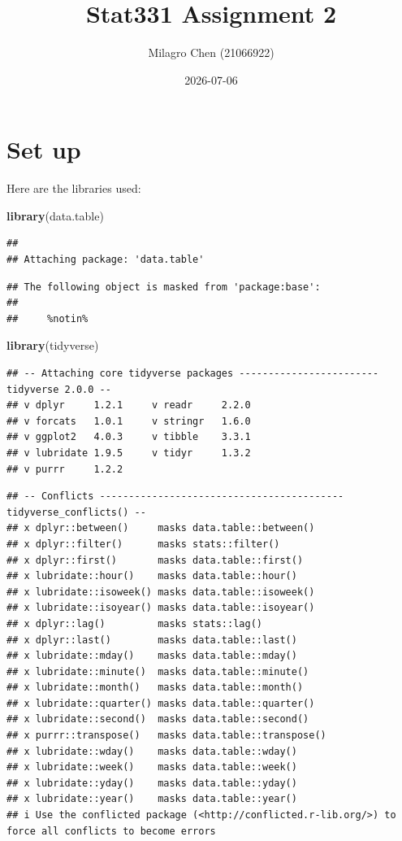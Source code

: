 \documentclass[
]{article}
\title{Stat331 Assignment 2}
\author{Milagro Chen (21066922)}
\date{2026-07-06}
\newenvironment{Shaded}{\begin{snugshade}}{\end{snugshade}}
\newcommand{\FunctionTok}[1]{\textcolor[rgb]{0.13,0.29,0.53}{\textbf{#1}}}
\newcommand{\NormalTok}[1]{#1}
\begin{document}
\maketitle

\section{Set up}\label{set-up}

Here are the libraries used:

\begin{Shaded}
\begin{Highlighting}[]
\FunctionTok{library}\NormalTok{(data.table)}
\end{Highlighting}
\end{Shaded}

\begin{verbatim}
## 
## Attaching package: 'data.table'
\end{verbatim}

\begin{verbatim}
## The following object is masked from 'package:base':
## 
##     %notin%
\end{verbatim}

\begin{Shaded}
\begin{Highlighting}[]
\FunctionTok{library}\NormalTok{(tidyverse)}
\end{Highlighting}
\end{Shaded}

\begin{verbatim}
## -- Attaching core tidyverse packages ------------------------ tidyverse 2.0.0 --
## v dplyr     1.2.1     v readr     2.2.0
## v forcats   1.0.1     v stringr   1.6.0
## v ggplot2   4.0.3     v tibble    3.3.1
## v lubridate 1.9.5     v tidyr     1.3.2
## v purrr     1.2.2
\end{verbatim}

\begin{verbatim}
## -- Conflicts ------------------------------------------ tidyverse_conflicts() --
## x dplyr::between()     masks data.table::between()
## x dplyr::filter()      masks stats::filter()
## x dplyr::first()       masks data.table::first()
## x lubridate::hour()    masks data.table::hour()
## x lubridate::isoweek() masks data.table::isoweek()
## x lubridate::isoyear() masks data.table::isoyear()
## x dplyr::lag()         masks stats::lag()
## x dplyr::last()        masks data.table::last()
## x lubridate::mday()    masks data.table::mday()
## x lubridate::minute()  masks data.table::minute()
## x lubridate::month()   masks data.table::month()
## x lubridate::quarter() masks data.table::quarter()
## x lubridate::second()  masks data.table::second()
## x purrr::transpose()   masks data.table::transpose()
## x lubridate::wday()    masks data.table::wday()
## x lubridate::week()    masks data.table::week()
## x lubridate::yday()    masks data.table::yday()
## x lubridate::year()    masks data.table::year()
## i Use the conflicted package (<http://conflicted.r-lib.org/>) to force all conflicts to become errors
\end{verbatim}
\end{document}
